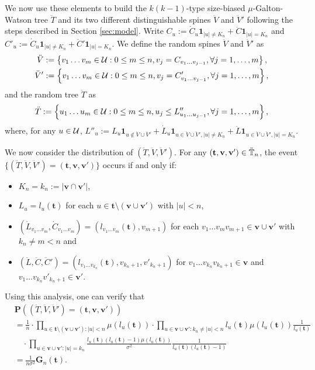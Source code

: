 \documentclass[12pt]{amsart}
\numberwithin{equation}{section}
\newcommand{\ind}[1]{\mathbf 1_{#1}}
\newcommand{\prob}{\mathbf P}
\newcommand{\abs}[1]{\left| #1 \right|}
\newcommand{\set}[1]{\left\{ #1 \right\}}
\newcommand{\tree}{\mathbf t}
\newcommand{\spine}{\mathbf v}
\newcommand{\bG}{\mathbf G}\newcommand{\bbG}{\mathbb G}\newcommand{\cG}{\mathcal G}
\begin{document}
	We now use these elements to build the $k(k-1)$-type size-biased
$\mu$-Galton-Watson tree $\ddot T$ and
	its two different distinguishable spines $\ddot V$ and $\ddot V'$ following the steps described in Section \ref{sec:model}.
	Write $C_u:=\dot C_u\ind{|u|\neq K_n}+\ddot C\ind{|u|=K_n}$ and $C'_u:=\dot C_u\ind{|u|\neq K_n}+\ddot C'\ind{|u|=K_n}$.
	We define the random spines $\ddot V$ and $\ddot V'$ as
\begin{align*}
        \ddot V
	&:=
				\set{v_1\dots v_m\in \cU:0\le m\le n, v_j= C_{v_1\dots v_{j-1}},\forall j=1,\dots,m},
	\\
		\ddot V'
	&:=
				\set{v_1\dots v_m\in \cU:0\le m \le n, v_j= C'_{v_1\dots v_{j-1}},\forall j=1,\dots,m},
\end{align*}
	and the random tree $\ddot T$ as
\begin{equation*}
	    \ddot T
	:=
		\set{u_1\dots u_m\in\cU: 0\le m\le n,u_j\leq L''_{u_1\dots u_{j-1}},\forall j=1,\dots,m},
\end{equation*}
	where, for any $u\in\mathcal U$, $L''_u:=L_u \ind{u\not\in \ddot V\cup\ddot V'}+\dot L_u \ind{u\in \ddot V\cup\ddot V',|u|\neq K_n}+\ddot L\ind{u\in \ddot V\cup\ddot V',|u|=K_n}$.
\par
We now consider the distribution of
	$(\ddot T,\ddot V,\ddot V')$. For any $(\tree,\spine,\spine')\in\ddot\bbT_n$, the event $\{(\ddot T,\ddot V,\ddot V')=(\tree,\spine,\spine')\}$ occurs if and only if:
\begin{itemize}
\item
    $K_n=k_n:=|\spine\cap\spine'|$,
\item
    $L_u=l_u(\tree)$ for each $u\in \tree\setminus(\spine\cup\spine')$ with $\abs{u}<n$,
\item
        $(\dot L_{v_1\dots v_m},\dot C_{v_1\dots v_m})=(l_{v_1\dots v_m}(\tree),v_{m+1})$ for each $v_1\dots v_mv_{m+1}\in\spine\cup\spine'$ with $k_n\neq m<n$ and
\item
        $(\ddot L,\ddot C,\ddot C')=(l_{v_1\dots v_{k_n}}(\tree),v_{k_n+1},v'_{k_n+1})$ for $v_1\dots v_{k_n}v_{k_n+1}\in\spine$ and $v_1\dots v_{k_n}v'_{k_n+1}\in\spine'$.
\end{itemize}
	Using this analysis, one can verify that
\begin{align*}
&\prob\left((\ddot T,\ddot V,\ddot V')=(\tree,\spine,\spine')\right)\\
&	= \frac{1}{n} \cdot
	    \prod_{u\in \tree\setminus(\spine\cup \spine'):|u|<n} \mu(l_u(\tree))
	\cdot
    	\prod_{u\in \spine\cup \spine':k_n\neq|u|<n}l_u(\tree)
    	\mu(l_u(\tree))\frac{1}{l_u(\tree)}
    \\
    &\quad\cdot
		\prod_{u\in \spine\cup \spine':|u|=k_n}\frac{l_u(\tree)(l_u(\tree)-1)
		\mu(l_u(\tree))}{\sigma^2}\frac{1}{l_u(\tree)(l_u(\tree)-1)}\\
	&=
		\frac{1}{n\sigma^2}
		\bG_n(\tree).
\end{align*}
\end{document}
